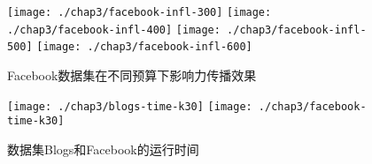 \begin{figure}[H]
	\centering%
	{\texttt{[image: ./chap3/facebook-infl-300]}}
	\hspace{3em}%
	{\texttt{[image: ./chap3/facebook-infl-400]}}
	\hspace{3em}%
	{\texttt{[image: ./chap3/facebook-infl-500]}}
	\hspace{3em}%
	{\texttt{[image: ./chap3/facebook-infl-600]}}
	\caption{Facebook数据集在不同预算下影响力传播效果}
	\label{fig:chap3:facebook-infl}
\end{figure}


\begin{figure}[H]
	\centering%
	{\texttt{[image: ./chap3/blogs-time-k30]}}
	\hspace{3em}%
	{\texttt{[image: ./chap3/facebook-time-k30]}}
	\caption{数据集Blogs和Facebook的运行时间}
	\label{fig:chap3:running-time}
\end{figure}


